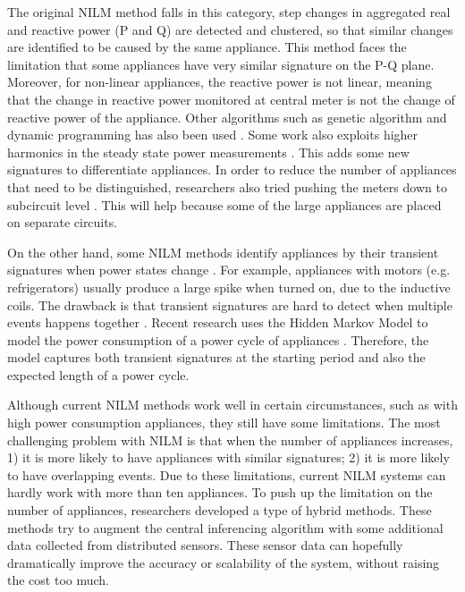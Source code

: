 The original NILM method \cite{Hart1992} falls in this category, step changes in aggregated real and reactive power (P and Q) are detected and clustered, so that similar changes are identified to be caused by the same appliance. This method faces the limitation that some appliances have very similar signature on the P-Q plane. Moreover, for non-linear appliances, the reactive power is not linear, meaning that the change in reactive power monitored at central meter is not the change of reactive power of the appliance. Other algorithms such as genetic algorithm and dynamic programming has also been used \cite{Baranski2004,Baranski2004a}. 
Some work also exploits higher harmonics in the steady state power measurements \cite{Laughman2003}. This adds some new signatures to differentiate appliances. 
In order to reduce the number of appliances that need to be distinguished, researchers also tried pushing the meters down to subcircuit level \cite{Marchiori2011}. This will help because some of the large appliances are placed on separate circuits. 

On the other hand, some NILM methods identify appliances by their transient signatures when power states change \cite{Leeb1995,Cox2006}. For example, appliances with motors (e.g. refrigerators) usually produce a large spike when turned on, due to the inductive coils. The drawback is that transient signatures are hard to detect when multiple events happens together \cite{Leeb1995}. Recent research uses the Hidden Markov Model to model the power consumption of a power cycle of appliances \cite{Kolter2012}. Therefore, the model captures both transient signatures at the starting period and also the expected length of a power cycle. 

Although current NILM methods work well in certain circumstances, such as with high power consumption appliances, they still have some limitations. The most challenging problem with NILM is that when the number of appliances increases, 1) it is more likely to have appliances with similar signatures; 2) it is more likely to have overlapping events. Due to these limitations, current NILM systems can hardly work with more than ten appliances. 
To push up the limitation on the number of appliances, researchers developed a type of hybrid methods. These methods try to augment the central inferencing algorithm with some additional data collected from distributed sensors. These sensor data can hopefully dramatically improve the accuracy or scalability of the system, without raising the cost too much. 

